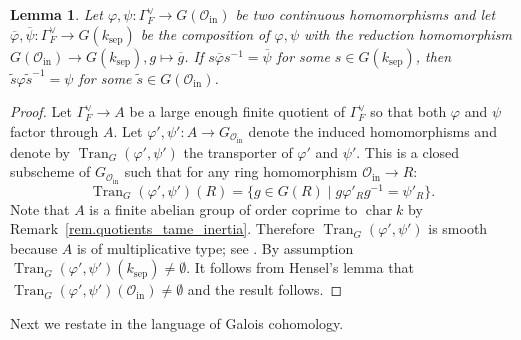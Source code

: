 \documentclass[12pt]{amsart}
\numberwithin{equation}{section}
\newtheorem{lemma}[theorem]{Lemma}
\theoremstyle{definition}
\newcommand{\cO}{\mathcal{O}}
\newcommand{\sep}{\operatorname{sep}}
\newcommand{\Char}{\operatorname{char}}
\newcommand{\ksep}{k_{\sep}}
\newcommand{\oin}{\operatorname{in}}
\newcommand{\Oin}{\cO_{\oin}}
\newcommand{\vphi}{\varphi}
\newcommand{\Tran}{\operatorname{Tran}}
\newcommand{\I}[1]{\Gamma_{#1}^{\vee}}
\begin{document}
\begin{lemma}\label{lem.conj_of_morphism}
    Let $\vphi,\psi: \I{F}\to G(\Oin)$ be two continuous homomorphisms and let $\overline{\vphi},\overline{\psi}: \I{F}\to G(\ksep)$ be the composition of $\vphi,\psi$ with the reduction homomorphism $G(\Oin) \to G(\ksep), g\mapsto \overline{g}$. If $s \overline{\vphi} s^{-1}= \overline{\psi}$ for some $s\in G(\ksep)$, then $\tilde{s} \vphi \tilde{s}^{-1} = \psi$ for some $\tilde{s}\in G(\Oin)$.
\end{lemma}
\begin{proof}
    Let $\I{F}\to A$ be a large enough finite quotient of $\I{F}$ so that both $\vphi$ and $\psi$ factor through $A$. Let $\vphi',\psi' : A\to G_{\Oin}$ denote the induced homomorphisms and denote by $\Tran_G(\vphi',\psi')$ the {transporter} of $\vphi'$ and $\psi'$. This is a closed subscheme of $G_{\Oin}$ such that for any ring homomorphism $\Oin \to R$:
    $$\Tran_G(\vphi',\psi')(R) = \{ g\in G(R) \mid g \vphi'_{R} g^{-1} =\psi'_R\}.$$
    Note that $A$ is a finite abelian group of order coprime to $\Char k$ by Remark~\ref{rem.quotients_tame_inertia}. Therefore $\Tran_G(\vphi',\psi')$ is smooth because $A$ is of multiplicative type; see \cite[Expose XI, Corollaire 5.2]{SGA3}. By assumption $\Tran_G(\vphi',\psi')(\ksep)\neq \emptyset$. It follows from Hensel's lemma that $\Tran_G(\vphi',\psi')(\Oin)\neq \emptyset$ and the result follows. 
\end{proof}

Next we restate \cite[Expose XXIV,Proposition 8.1]{SGA3} in the language of Galois cohomology.
\end{document}
